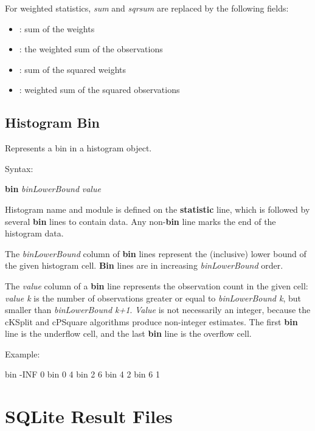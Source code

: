 For weighted statistics, \textit{sum} and \textit{sqrsum} are replaced
by the following fields:

\begin{itemize}
    \item {}: sum of the weights
    \item {}: the weighted sum of the observations
    \item {}:  sum of the squared weights
    \item {}: weighted sum of the squared observations
\end{itemize}


\subsection{Histogram Bin}
\label{sec:result-file-formats:opp:histogram-bin}

Represents a bin in a histogram object.

Syntax:

\hspace{20mm} \textbf{bin} \textit{binLowerBound} \textit{value}

Histogram name and module is defined on the \textbf{statistic} line,
which is followed by several \textbf{bin} lines to contain data. Any
non{}-\textbf{bin} line marks the end of the histogram data.

The \textit{binLowerBound} column of \textbf{bin} lines represent the
(inclusive) lower bound of the given histogram cell. \textbf{Bin} lines are in
increasing \textit{binLowerBound} order.

The \textit{value} column of a \textbf{bin} line represents the observation
count in the given cell: \textit{value k} is the number of observations
greater or equal to \textit{binLowerBound k}, but smaller than
\textit{binLowerBound k+1}. \textit{Value} is not necessarily an
integer, because the cKSplit and cPSquare algorithms produce
non{}-integer estimates. The first \textbf{bin} line is the underflow
cell, and the last \textbf{bin} line is the overflow cell.

Example:

\begin{filelisting}
bin -INF  0
bin 0 4
bin 2 6
bin 4 2
bin 6 1
\end{filelisting}


\section{SQLite Result Files}
\label{cha:result-file-formats:sqlite}

